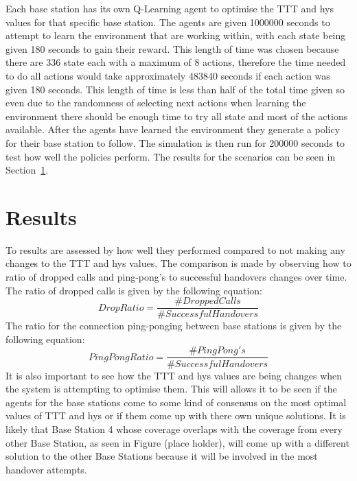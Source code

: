 Each base station has its own Q-Learning agent to optimise the TTT and hys values for that specific base station. The agents are given 1000000 seconds to attempt to learn the environment that are working within, with each state being given 180 seconds to gain their reward. This length of time was chosen because there are 336 state each with a maximum of 8 actions, therefore the time needed to do all actions would take approximately 483840 seconds if each action was given 180 seconds. This length of time is less than half of the total time given so even due to the randomness of selecting next actions when learning the environment there should be enough time to try all state and most of the actions available. After the agents have learned the environment they generate a policy for their base station to follow. The simulation is then run for 200000 seconds to test how well the policies perform. The results for the scenarios can be seen in Section~\ref{results}.
\section{Results}\label{results}
To results are assessed by how well they performed compared to not making any changes to the TTT and hys values. The comparison is made by observing how to ratio of dropped calls and ping-pong's to successful handovers changes over time. The ratio of dropped calls is given by the following equation:
\begin{equation}\label{eq:drop}
Drop Ratio = \frac{\#Dropped Calls}{\#Successful Handovers}
\end{equation}
The ratio for the connection ping-ponging between base stations is given by the following equation:
\begin{equation}\label{eq:ping}
PingPong Ratio = \frac{\#PingPong's}{\#Successful Handovers}
\end{equation}
It is also important to see how the TTT and hys values are being changes when the system is attempting to optimise them. This will allows it to be seen if the agents for the base stations come to some kind of consensus on the most optimal values of TTT and hys or if them come up with there own unique solutions. It is likely that Base Station 4 whose coverage overlaps with the coverage from every other Base Station, as seen in Figure (place holder), will come up with a different solution to the other Base Stations because it will be involved in the most handover attempts.

